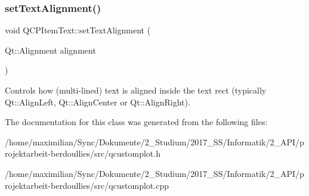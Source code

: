\subsubsection{\texorpdfstring{set\+Text\+Alignment()}{setTextAlignment()}}
{\footnotesize\ttfamily void Q\+C\+P\+Item\+Text\+::set\+Text\+Alignment (\begin{DoxyParamCaption}\item[{Qt\+::\+Alignment}]{alignment }\end{DoxyParamCaption})}

Controls how (multi-\/lined) text is aligned inside the text rect (typically Qt\+::\+Align\+Left, Qt\+::\+Align\+Center or Qt\+::\+Align\+Right). 

The documentation for this class was generated from the following files\+:\begin{DoxyCompactItemize}
\item 
/home/maximilian/\+Sync/\+Dokumente/2\+\_\+\+Studium/2017\+\_\+\+S\+S/\+Informatik/2\+\_\+\+A\+P\+I/projektarbeit-\/berdoullies/src/qcustomplot.\+h\item 
/home/maximilian/\+Sync/\+Dokumente/2\+\_\+\+Studium/2017\+\_\+\+S\+S/\+Informatik/2\+\_\+\+A\+P\+I/projektarbeit-\/berdoullies/src/qcustomplot.\+cpp\end{DoxyCompactItemize}
